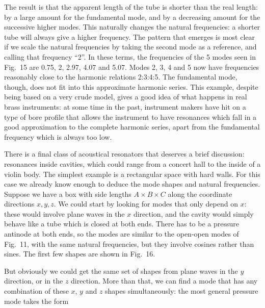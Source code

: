   The result is that the apparent length of the tube is shorter than the real 
  length: by a large amount for the fundamental mode, and by a decreasing 
  amount for the successive higher modes. This naturally changes the natural 
  frequencies: a shorter tube will always give a higher frequency. The pattern 
  that emerges is most clear if we scale the natural frequencies by taking the 
  second mode as a reference, and calling that frequency ``2''. In these terms, 
  the frequencies of the 5 modes seen in Fig.\ 15 are 0.75, 2, 2.97, 4.07 and 
  5.07. Modes 2, 3, 4 and 5 now have frequencies reasonably close to the 
  harmonic relations 2:3:4:5. The fundamental mode, though, does not fit into 
  this approximate harmonic series. This example, despite being based on a very 
  crude model, gives a good idea of what happens in real brass instruments: at 
  some time in the past, instrument makers have hit on a type of bore profile 
  that allows the instrument to have resonances which fall in a good 
  approximation to the complete harmonic series, apart from the fundamental 
  frequency which is always too low. 


  There is a final class of acoustical resonators that deserves a brief 
  discussion: resonances inside cavities, which could range from a concert hall 
  to the inside of a violin body. The simplest example is a rectangular space 
  with hard walls. For this case we already know enough to deduce the mode 
  shapes and natural frequencies. Suppose we have a box with side lengths $A 
  \times B \times C$ along the coordinate directions $x,y,z$. We could start by 
  looking for modes that only depend on $x$: these would involve plane waves in 
  the $x$ direction, and the cavity would simply behave like a tube which is 
  closed at both ends. There has to be a pressure antinode at both ends, so the 
  modes are similar to the open-open modes of Fig.\ 11, with the same natural 
  frequencies, but they involve cosines rather than sines. The first few shapes 
  are shown in Fig.\ 16. 


  But obviously we could get the same set of shapes from plane waves in the $y$ 
  direction, or in the $z$ direction. More than that, we can find a mode that 
  has any combination of these $x$, $y$ and $z$ shapes simultaneously: the most 
  general pressure mode takes the form 

